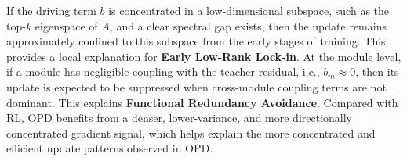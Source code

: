 \documentclass{llmxive}
\begin{document}
If the driving term \(b\) is concentrated in a low-dimensional subspace, such as the top-\(k\) eigenspace of \(A\), and a clear spectral gap exists, then the update remains approximately confined to this subspace from the early stages of training. This provides a local explanation for \textbf{Early Low-Rank Lock-in}. 
At the module level, if a module has negligible coupling with the teacher residual, i.e., \(b_m\approx 0\), then its update is expected to be suppressed when cross-module coupling terms are not dominant. This explains \textbf{Functional Redundancy Avoidance}. 
Compared with RL, OPD benefits from a denser, lower-variance, and more directionally concentrated gradient signal, which helps explain the more concentrated and efficient update patterns observed in OPD.






\end{document}
